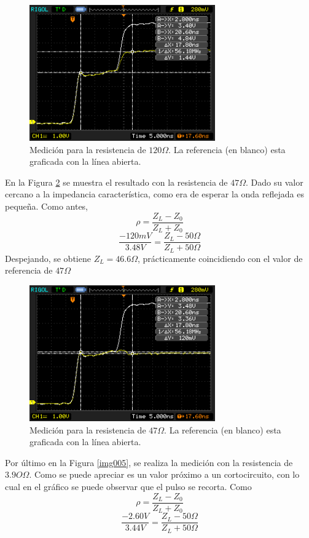 \documentclass[a4paper,10pt]{article}
\begin{document}
		\begin{figure}[!htb]
			\centering
			\includegraphics[width=8cm]
			{Imagenes/Res120.png}
			\caption{Medici\'on para la resistencia de $120\Omega$. La 
			referencia (en blanco) esta graficada con la l\'inea abierta.}
			\label{img003}
		\end{figure}
	
	\indent En la Figura \ref{img004} se muestra el resultado con la 
	resistencia de $47\Omega$. Dado su valor cercano a la impedancia 
	caracter\'istica, como era de esperar la onda reflejada es peque\~na. Como
	antes, $$\rho=\frac{Z_L-Z_0}{Z_L+Z_0}$$
	$$\frac{-120mV}{3.48V}=\frac{Z_L- 50\Omega}{Z_L+50\Omega}$$
	\indent Despejando, se obtiene $Z_L=46.6\Omega$, pr\'acticamente 
	coincidiendo con el valor de referencia de $47\Omega$
	
		\begin{figure}[!htb]
			\centering
			\includegraphics[width=8cm]
			{Imagenes/Res47.png}
			\caption{Medici\'on para la resistencia de $47\Omega$. La 
			referencia (en blanco) esta graficada con la l\'inea abierta.}
			\label{img004}
		\end{figure}

	\indent Por \'ultimo en la Figura \ref{img005}, se realiza la medici\'on 
	con la resistencia de $3.9O\Omega$. Como se puede apreciar es un valor 
	pr\'oximo a un cortocircuito, con lo cual en el gr\'afico se puede 
	observar que el pulso se recorta. Como $$\rho=\frac{Z_L-Z_0}{Z_L+Z_0}$$
	$$\frac{-2.60V}{3.44V}=\frac{Z_L- 50\Omega}{Z_L+50\Omega}$$
	
\end{document}
